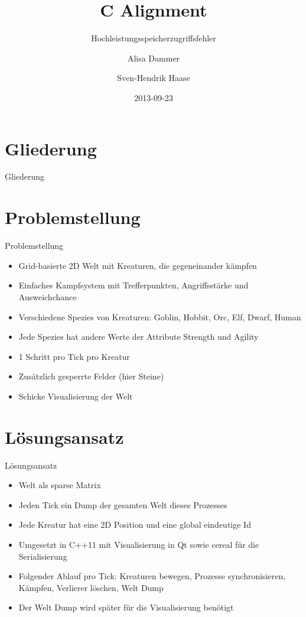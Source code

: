 \documentclass{beamer}
\begin{document}
\title{C Alignment}
\subtitle{Hochleistungsspeicherzugriffsfehler}
\date{2013-09-23}
\author{Alisa Dammer \and Sven-Hendrik Haase}

\begin{frame}
    \titlepage
\end{frame}

\section*{Gliederung}
\begin{frame}{Gliederung}
    \tableofcontents
\end{frame}

\section{Problemstellung}
\begin{frame}{Problemstellung}
\begin{itemize}
    \item Grid-basierte 2D Welt mit Kreaturen, die gegeneinander kämpfen
    \item Einfaches Kampfsystem mit Trefferpunkten, Angriffsstärke und Ausweichchance
    \item Verschiedene Spezies von Kreaturen: Goblin, Hobbit, Orc, Elf, Dwarf, Human
    \item Jede Spezies hat andere Werte der Attribute Strength und Agility
    \item 1 Schritt pro Tick pro Kreatur
    \item Zusätzlich gesperrte Felder (hier Steine)
    \item Schicke Visualisierung der Welt
\end{itemize}
\end{frame}


\section{Lösungsansatz}
\begin{frame}{Lösungsansatz}
\begin{itemize}
    \item Welt als sparse Matrix
    \item Jeden Tick ein Dump der gesamten Welt dieses Prozesses
    \item Jede Kreatur hat eine 2D Position und eine global eindeutige Id
    \item Umgesetzt in C++11 mit Visualisierung in Qt sowie cereal für die Serialisierung
    \item Folgender Ablauf pro Tick: Kreaturen bewegen, Prozesse synchronisieren, Kämpfen, Verlierer löschen, Welt Dump
    \item Der Welt Dump wird später für die Visualisierung benötigt
\end{itemize}
\end{frame}
\end{document}
